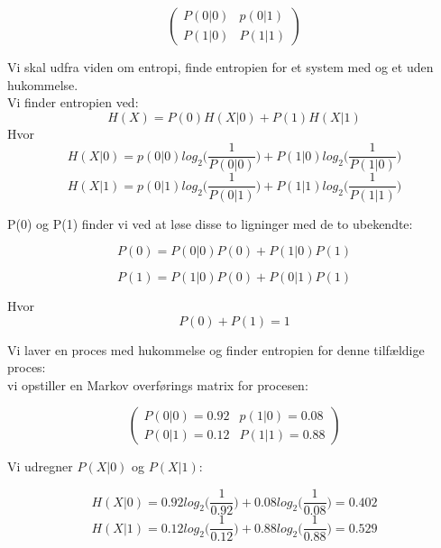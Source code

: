 \[ \left( \begin{array}{ccc}
P(0|0) & p(0|1)  \\
P(1|0) & P(1|1) \end{array} \right)\] 

Vi skal udfra viden om entropi, finde entropien for et system med og et uden hukommelse.\\
Vi finder entropien ved:
\begin{equation}
H(X) = P(0)H(X|0)+P(1)H(X|1)
\end{equation}
Hvor
\begin{equation}
H(X|0)=p(0|0)log_2 \bigg(\frac{1}{P(0|0)}\bigg)+P(1|0)log_2\bigg(\frac{1}{P(1|0)}\bigg)
\end{equation}
\begin{equation}
H(X|1)=p(0|1)log_2 \bigg(\frac{1}{P(0|1)}\bigg)+P(1|1)log_2\bigg(\frac{1}{P(1|1)}\bigg)
\end{equation}

P(0) og P(1) finder vi ved at løse disse to ligninger med de to ubekendte:

\begin{equation}
P(0) = P(0|0)P(0)+P(1|0)P(1)
\end{equation}

\begin{equation}
P(1)=P(1|0)P(0)+P(0|1)P(1)
\end{equation}

Hvor
\begin{equation}
P(0)+P(1)=1
\end{equation}

Vi laver en proces med hukommelse og finder entropien for denne tilfældige proces:\\ vi opstiller en Markov overførings matrix for procesen:

\[ \left( \begin{array}{ccc}
P(0|0) = 0.92 & p(1|0) = 0.08   \\
P(0|1) = 0.12  & P(1|1) = 0.88  \end{array} \right)\] 

Vi udregner $P(X|0)$ og $P(X|1)$:

\begin{equation}
H(X|0)=0.92log_2 \bigg(\frac{1}{0.92}\bigg)+0.08log_2\bigg(\frac{1}{0.08}\bigg) = 0.402
\end{equation}
\begin{equation}
H(X|1)=0.12log_2 \bigg(\frac{1}{0.12}\bigg)+0.88log_2\bigg(\frac{1}{0.88}\bigg) = 0.529
\end{equation}

